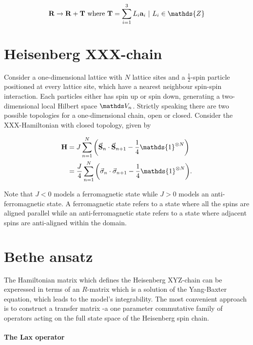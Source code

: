 \documentclass{homework}
\begin{document}
$$
\Rb \rightarrow \Rb + {\bf T} \textnormal{ where } {\bf T} = \sum_{i=1}^{3} L_i {\bf a}_i \blanky | \blanky L_i \in \mathds{Z}
$$

\clearpage

\section{Heisenberg XXX-chain}

Consider a one-dimensional lattice with $N$ lattice sites and a $\frac{1}{2}$-spin particle positioned at every lattice site, which have a nearest neighbour spin-spin interaction. Each particles either has spin up or spin down, generating a two-dimensional local Hilbert space $\vds_n$. Strictly speaking there are two possible topologies for a one-dimensional chain, open or closed. Consider the XXX-Hamiltonian with closed topology, given by 

\begin{equation}
\begin{split}
    {\bf H} &= J \sum_{n=1}^{N} \bigg(\vec{\spin}_n \cdot \vec{\spin}_{n+1} - \frac{1}{4} \mathds{1}^{\otimes N} \bigg) \\
    &= \frac{J}{4}\sum_{n=1}^{N} \bigg(\vec{\sigma}_n \cdot \vec{\sigma}_{n+1} - \frac{1}{4} \mathds{1}^{\otimes N} \bigg).
    \label{XXX model}
\end{split}
\end{equation}

Note that $J < 0$ models a ferromagnetic state while $J > 0$ models an anti-ferromagnetic state. A ferromagnetic state refers to a state where all the spins are aligned parallel while an anti-ferromagnetic state refers to a state where adjacent spins are anti-aligned within the domain. 

\section{Bethe ansatz}

The Hamiltonian matrix which defines the Heisenberg XYZ-chain can be experessed in terms of an $R$-matrix which is a solution of the Yang-Baxter equation, which leads to the model's integrability. The most convenient approach is to construct a transfer matrix -a one parameter commutative family of operators acting on the full state space of the Heisenberg spin chain. \\

\paragraph{\textbf{The Lax operator}}
\end{document}
